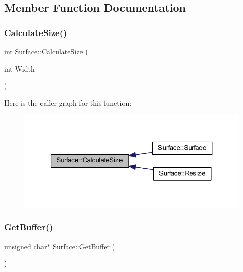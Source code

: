 \subsection{Member Function Documentation}
\mbox{\label{class_surface_aeb8a8540f415a4d29c440667e8532e91}} 
\subsubsection{\texorpdfstring{Calculate\+Size()}{CalculateSize()}}
{\footnotesize\ttfamily int Surface\+::\+Calculate\+Size (\begin{DoxyParamCaption}\item[{int}]{Width }\end{DoxyParamCaption})}

Here is the caller graph for this function\+:
\nopagebreak
\begin{figure}[H]
\begin{center}
\leavevmode
\includegraphics[width=321pt]{class_surface_aeb8a8540f415a4d29c440667e8532e91_icgraph}
\end{center}
\end{figure}
\mbox{\label{class_surface_a8f8da8f3ee82b8e657916f40b3f40eff}} 
\subsubsection{\texorpdfstring{Get\+Buffer()}{GetBuffer()}}
{\footnotesize\ttfamily unsigned char$\ast$ Surface\+::\+Get\+Buffer (\begin{DoxyParamCaption}{ }\end{DoxyParamCaption})\hspace{0.3cm}{\ttfamily [inline]}}

